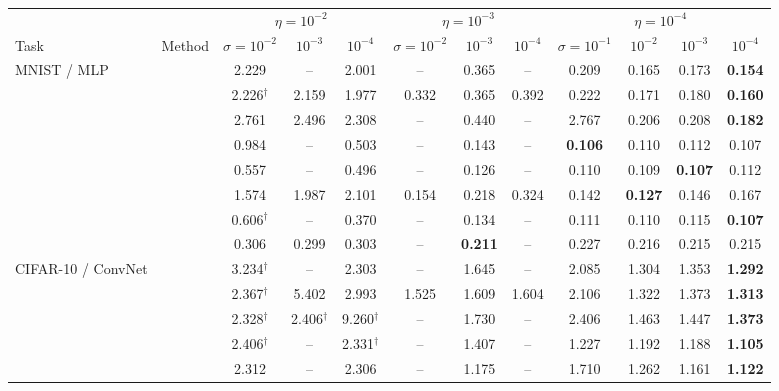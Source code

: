\begin{tabular}{ll ccc ccc cccc}
\toprule
 & & \multicolumn{3}{c}{$\eta=10^{-2}$} & \multicolumn{3}{c}{$\eta=10^{-3}$} & \multicolumn{4}{c}{$\eta=10^{-4}$} \\
\cmidrule(lr){3-5}\cmidrule(lr){6-8}\cmidrule(lr){9-12}
Task & Method & $\sigma{=}10^{-2}$ & $10^{-3}$ & $10^{-4}$ & $\sigma{=}10^{-2}$ & $10^{-3}$ & $10^{-4}$ & $\sigma{=}10^{-1}$ & $10^{-2}$ & $10^{-3}$ & $10^{-4}$ \\
\midrule
MNIST / MLP & \SPSA{} & 2.229 & -- & 2.001 & -- & 0.365 & -- & 0.209 & 0.165 & 0.173 & \textbf{0.154} \\
 & \SPSAb{} & 2.226$^\dagger$ & 2.159 & 1.977 & 0.332 & 0.365 & 0.392 & 0.222 & 0.171 & 0.180 & \textbf{0.160} \\
 & \RS{} & 2.761 & 2.496 & 2.308 & -- & 0.440 & -- & 2.767 & 0.206 & 0.208 & \textbf{0.182} \\
 & \NP{} & 0.984 & -- & 0.503 & -- & 0.143 & -- & \textbf{0.106} & 0.110 & 0.112 & 0.107 \\
 & \ANP{} & 0.557 & -- & 0.496 & -- & 0.126 & -- & 0.110 & 0.109 & \textbf{0.107} & 0.112 \\
 & \ANPb{} & 1.574 & 1.987 & 2.101 & 0.154 & 0.218 & 0.324 & 0.142 & \textbf{0.127} & 0.146 & 0.167 \\
 & \INP{} & 0.606$^\dagger$ & -- & 0.370 & -- & 0.134 & -- & 0.111 & 0.110 & 0.115 & \textbf{0.107} \\
 & \DANP{} & 0.306 & 0.299 & 0.303 & -- & \textbf{0.211} & -- & 0.227 & 0.216 & 0.215 & 0.215 \\
\midrule
CIFAR-10 / ConvNet & \SPSA{} & 3.234$^\dagger$ & -- & 2.303 & -- & 1.645 & -- & 2.085 & 1.304 & 1.353 & \textbf{1.292} \\
 & \SPSAb{} & 2.367$^\dagger$ & 5.402 & 2.993 & 1.525 & 1.609 & 1.604 & 2.106 & 1.322 & 1.373 & \textbf{1.313} \\
 & \RS{} & 2.328$^\dagger$ & 2.406$^\dagger$ & 9.260$^\dagger$ & -- & 1.730 & -- & 2.406 & 1.463 & 1.447 & \textbf{1.373} \\
 & \NP{} & 2.406$^\dagger$ & -- & 2.331$^\dagger$ & -- & 1.407 & -- & 1.227 & 1.192 & 1.188 & \textbf{1.105} \\
 & \ANP{} & 2.312 & -- & 2.306 & -- & 1.175 & -- & 1.710 & 1.262 & 1.161 & \textbf{1.122} \\

\end{tabular}
